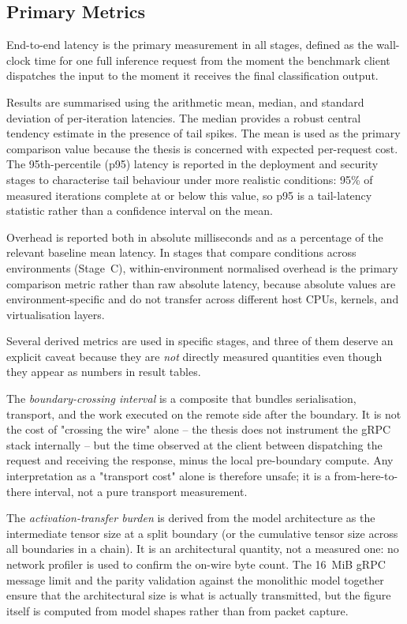 \subsection{Primary Metrics}

End-to-end latency is the primary measurement in all stages, defined as the wall-clock
time for one full inference request from the moment the benchmark client dispatches the
input to the moment it receives the final classification output.

Results are summarised using the arithmetic mean, median, and standard deviation of
per-iteration latencies.
The median provides a robust central tendency estimate in the presence of tail spikes.
The mean is used as the primary comparison value because the thesis is concerned with
expected per-request cost.
The 95th-percentile (p95) latency is reported in the deployment and security stages to
characterise tail behaviour under more realistic conditions: 95\% of measured
iterations complete at or below this value, so p95 is a tail-latency statistic rather
than a confidence interval on the mean.

Overhead is reported both in absolute milliseconds and as a percentage of the relevant
baseline mean latency.
In stages that compare conditions across environments (Stage~C), within-environment
normalised overhead is the primary comparison metric rather than raw absolute latency,
because absolute values are environment-specific and do not transfer across different
host CPUs, kernels, and virtualisation layers.

Several derived metrics are used in specific stages, and three of them deserve an
explicit caveat because they are \emph{not} directly measured quantities even though they
appear as numbers in result tables.

The \emph{boundary-crossing interval} is a composite that bundles serialisation,
transport, and the work executed on the remote side after the boundary. It is not the
cost of "crossing the wire" alone -- the thesis does not instrument the gRPC stack
internally -- but the time observed at the client between dispatching the request and
receiving the response, minus the local pre-boundary compute. Any interpretation as a
"transport cost" alone is therefore unsafe; it is a from-here-to-there interval, not a
pure transport measurement.

The \emph{activation-transfer burden} is derived from the model architecture as the
intermediate tensor size at a split boundary (or the cumulative tensor size across all
boundaries in a chain). It is an architectural quantity, not a measured one: no network
profiler is used to confirm the on-wire byte count. The 16~MiB gRPC message limit and
the parity validation against the monolithic model together ensure that the architectural
size is what is actually transmitted, but the figure itself is computed from model shapes
rather than from packet capture.


